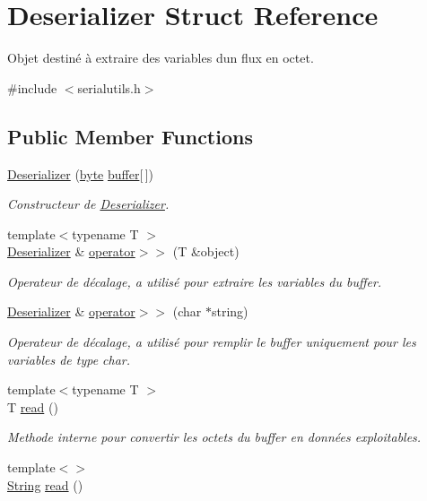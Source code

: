 \hypertarget{struct_deserializer}{}\section{Deserializer Struct Reference}
\label{struct_deserializer}


Objet destiné à extraire des variables d\textquotesingle{}un flux en octet.  




{\ttfamily \#include $<$serialutils.\+h$>$}

\subsection*{Public Member Functions}
\begin{DoxyCompactItemize}
\item 
\hyperlink{struct_deserializer_ae6463833d115113e2d7ed91c79d0c988}{Deserializer} (\hyperlink{serialutils_8h_a0c8186d9b9b7880309c27230bbb5e69d}{byte} \hyperlink{struct_deserializer_a37f4bae0d8a61c6c556ba3e90a10f0c4}{buffer}\mbox{[}$\,$\mbox{]})
\begin{DoxyCompactList}\small\item\em Constructeur de \hyperlink{struct_deserializer}{Deserializer}. \end{DoxyCompactList}\item 
{\footnotesize template$<$typename T $>$ }\\\hyperlink{struct_deserializer}{Deserializer} \& \hyperlink{struct_deserializer_acda0fe1ee62c4f5de3d70104a20bc41a}{operator$>$$>$} (T \&object)
\begin{DoxyCompactList}\small\item\em Operateur de décalage, a utilisé pour extraire les variables du buffer. \end{DoxyCompactList}\item 
\hyperlink{struct_deserializer}{Deserializer} \& \hyperlink{struct_deserializer_aef72a346514298e1e71e69e9aef3b96f}{operator$>$$>$} (char $\ast$string)
\begin{DoxyCompactList}\small\item\em Operateur de décalage, a utilisé pour remplir le buffer uniquement pour les variables de type char. \end{DoxyCompactList}\item 
{\footnotesize template$<$typename T $>$ }\\T \hyperlink{struct_deserializer_af93dc898d561ad0b1d8b86ddf49053ca}{read} ()
\begin{DoxyCompactList}\small\item\em Methode interne pour convertir les octets du buffer en données exploitables. \end{DoxyCompactList}\item 
{\footnotesize template$<$$>$ }\\\hyperlink{serialutils_8h_afbeda3fd1bdc8c37d01bdf9f5c8274ff}{String} \hyperlink{struct_deserializer_aefa095423e11239219f8a472547a6d22}{read} ()
\end{DoxyCompactItemize}
